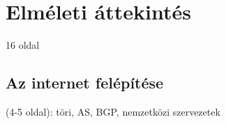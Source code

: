 \chapter{Elméleti áttekintés}
16 oldal




\section{Az internet felépítése}
(4-5 oldal): töri, AS, BGP, nemzetközi szervezetek

